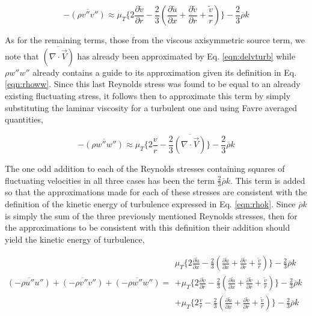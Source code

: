 \begin{equation}
	-\overline{(\rho v'' v'')} \approx \mu_T\Big\{2\frac{\partial \tilde{v}}{\partial r} - \frac{2}{3}
	(\frac{\partial \tilde{u}}{\partial x} + \frac{\partial \tilde{v}}{\partial r} + \frac{\tilde{v}}{r})\Big\}
	-\frac{2}{3}\overline{\rho}k
\label{eqn:rhovv}
\end{equation}

	As for the remaining terms, those from the viscous axisymmetric source term, we note that $\overline{(\nabla
\cdot \vec{V})}$ has already been approximated by Eq. \ref{eqn:delvturb} while $\rho w'' w''$ already contains a
guide to its approximation given its definition in Eq. \ref{eqn:rhoww}.  Since this last Reynolds stress was
found to be equal to an already existing fluctuating stress, it follows then to approximate this term by simply
substituting the laminar viscosity for a turbulent one and using Favre averaged quantities,

\begin{equation}
	-\overline{(\rho w'' w'')} \approx \mu_T \Big\{2\frac{v}{r} -
	\frac{2}{3}\overline{(\nabla \cdot \vec{V})} \Big\} - \frac{2}{3}\overline{\rho}k
\label{eqn:rhowwapprox}
\end{equation}

	The one odd addition to each of the Reynolds stresses containing squares of fluctuating velocities in all
three cases has been the term $\frac{2}{3}\overline{\rho}k$.  This term is added so that the approximations made
for each of these stresses are consistent with the definition of the kinetic energy of turbulence expressed in 
Eq. \ref{eqn:rhok}.  Since $\overline{\rho}k$ is simply the sum of the three previously mentioned Reynolds stresses, then 
for the approximations to be consistent with this definition their addition should yield the kinetic energy of
turbulence,

\begin{displaymath}
	\overline{(-\rho u'' u'')} + \overline{(-\rho v'' v'')} + \overline{(-\rho w'' w'')} =
		\begin{array}{c}
	\mu_T\Big\{2\frac{\partial \tilde{u}}{\partial x} - \frac{2}{3}
	(\frac{\partial \tilde{u}}{\partial x} + \frac{\partial \tilde{v}}{\partial r} + \frac{\tilde{v}}{r})\Big\}
	-\frac{2}{3}\overline{\rho}k  \\ +
	\mu_T\Big\{2\frac{\partial \tilde{v}}{\partial r} - \frac{2}{3}
	(\frac{\partial \tilde{u}}{\partial x} + \frac{\partial \tilde{v}}{\partial r} + \frac{\tilde{v}}{r})\Big\}
	-\frac{2}{3}\overline{\rho}k \\ + \mu_T \Big\{2\frac{v}{r} -
	\frac{2}{3}(\frac{\partial \tilde{u}}{\partial x} + \frac{\partial \tilde{v}}{\partial r} + 
	\frac{\tilde{v}}{r}) \Big\} - \frac{2}{3}\overline{\rho}k
		\end{array}
\end{displaymath}


